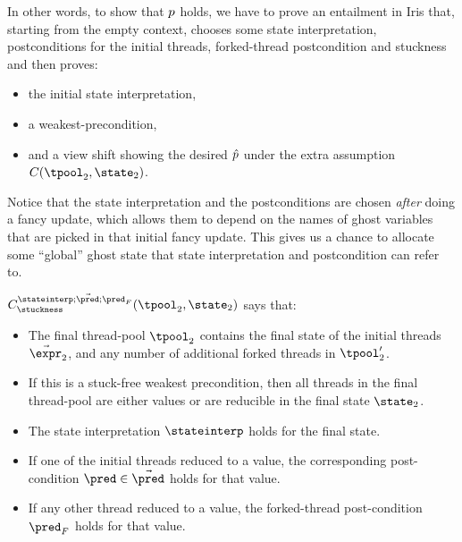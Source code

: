 In other words, to show that $p$ holds, we have to prove an entailment in Iris that, starting from the empty context, chooses some state interpretation, postconditions for the initial threads, forked-thread postcondition and stuckness and then proves:
\begin{itemize}
  \item the initial state interpretation,
  \item a weakest-precondition,
  \item and a view shift showing the desired $\hat{p}$ under the extra assumption $\consstate(\tpool_2, \state_2)$.
\end{itemize}
Notice that the state interpretation and the postconditions are chosen \emph{after} doing a fancy update, which allows them to depend on the names of ghost variables that are picked in that initial fancy update.
This gives us a chance to allocate some ``global'' ghost state that state interpretation and postcondition can refer to.

$\consstate^{\stateinterp;\vec\pred;\pred_F}_{\stuckness}(\tpool_2, \state_2)$ says that:
\begin{itemize}
\item The final thread-pool $\tpool_2$ contains the final state of the initial threads $\vec\expr_2$, and any number of additional forked threads in $\tpool_2'$.
\item If this is a stuck-free weakest precondition, then all threads in the final thread-pool are either values or are reducible in the final state $\state_2$.
\item The state interpretation $\stateinterp$ holds for the final state.
\item If one of the initial threads reduced to a value, the corresponding post-condition $\pred \in \vec\pred$ holds for that value.
\item If any other thread reduced to a value, the forked-thread post-condition $\pred_F$ holds for that value.
\end{itemize}

~\par

